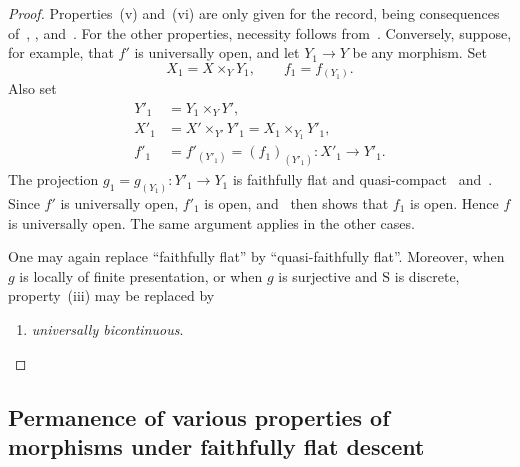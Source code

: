 \begin{proof}
Properties~(v) and~(vi) are only given for the record, being consequences
of~, , and~. For the
other properties, necessity follows from~. Conversely,
suppose, for example, that $f'$ is universally open, and let
$Y_1\to Y$ be any morphism. Set
\[
  X_1=X\times_Y Y_1,\qquad f_1=f_{(Y_1)}.
\]
Also set
\[
\begin{aligned}
  Y'_1&=Y_1\times_Y Y',\\
  X'_1&=X'\times_{Y'}Y'_1=X_1\times_{Y_1}Y'_1,\\
  f'_1&=f'_{(Y'_1)}=(f_1)_{(Y'_1)}:X'_1\to Y'_1.
\end{aligned}
\]
The projection $g_1=g_{(Y_1)}:Y'_1\to Y_1$ is faithfully flat and
quasi-compact~ and~. Since $f'$ is
universally open, $f'_1$ is open, and~ then shows that
$f_1$ is open. Hence $f$ is universally open. The same argument applies
in the other cases.

One may again replace ``faithfully flat'' by ``quasi-faithfully flat''.
Moreover, when $g$ is locally of finite presentation, or when $g$ is
surjective and $\mathrm{S}$ is discrete, property~(iii) may be replaced
by
\begin{enumerate}
  \item[(iii \emph{bis})] \emph{universally bicontinuous}.
\end{enumerate}
\end{proof}


\subsection{Permanence of various properties of morphisms under faithfully flat descent}
\label{subsection:IV.2.7}

